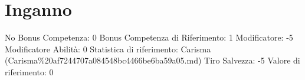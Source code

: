 \section{Inganno}\label{inganno}

\begin{description}
\tightlist
\item[Tags: ABI]
No Bonus Competenza: 0 Bonus Competenza di Riferimento: 1 Modificatore:
-5 Modificatore Abilità: 0 Statistica di riferimento: Carisma
(Carisma\%20af7244707a084548bc4466be6ba59a05.md) Tiro Salvezza: -5
Valore di riferimento: 0
\end{description}
